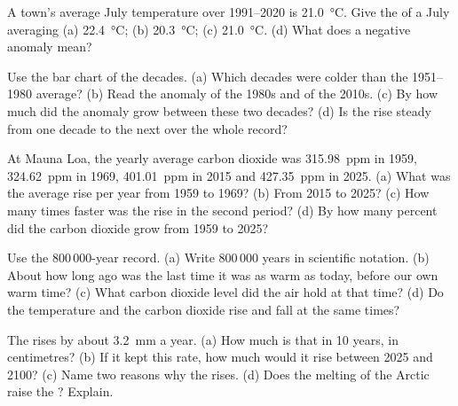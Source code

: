 \begin{exercise}[$\star$]\label{exo:g9:climate-past-and-present:4}
A town's average July temperature over 1991--2020 is
\qty{21.0}{\degreeCelsius}. Give the  of a July
averaging (a) \qty{22.4}{\degreeCelsius}; (b) \qty{20.3}{\degreeCelsius};
(c) \qty{21.0}{\degreeCelsius}. (d) What does a negative anomaly mean?
\end{exercise}

\begin{exercise}[$\star\star$]\label{exo:g9:climate-past-and-present:5}
Use the bar chart of the decades. (a) Which decades were colder than the
1951--1980 average? (b) Read the anomaly of the 1980s and of the 2010s.
(c) By how much did the anomaly grow between these two decades? (d) Is
the rise steady from one decade to the next over the whole record?
\end{exercise}

\begin{exercise}[$\star\star$]\label{exo:g9:climate-past-and-present:6}
At Mauna Loa, the yearly average carbon dioxide was \qty{315.98}{ppm} in
1959, \qty{324.62}{ppm} in 1969, \qty{401.01}{ppm} in 2015 and \qty{427.35}{ppm} in 2025. (a) What was the
average rise per year from 1959 to 1969? (b) From 2015 to 2025? (c) How
many times faster was the rise in the second period? (d) By how many
percent did the carbon dioxide grow from 1959 to 2025?
\end{exercise}

\begin{exercise}[$\star\star$]\label{exo:g9:climate-past-and-present:7}
Use the 800\,000-year record. (a) Write 800\,000 years in scientific
notation. (b) About how long ago was the last time it was as warm as
today, before our own warm time? (c) What carbon dioxide level did the
air hold at that time? (d) Do the temperature and the carbon dioxide rise
and fall at the same times?
\end{exercise}

\begin{exercise}[$\star\star$]\label{exo:g9:climate-past-and-present:8}
The  rises by about \qty{3.2}{mm} a year. (a) How much is that in 10
years, in centimetres? (b) If it kept this rate, how much would it rise
between 2025 and 2100? (c) Name two reasons why the  rises. (d) Does
the melting of the Arctic  raise the ? Explain.
\end{exercise}

